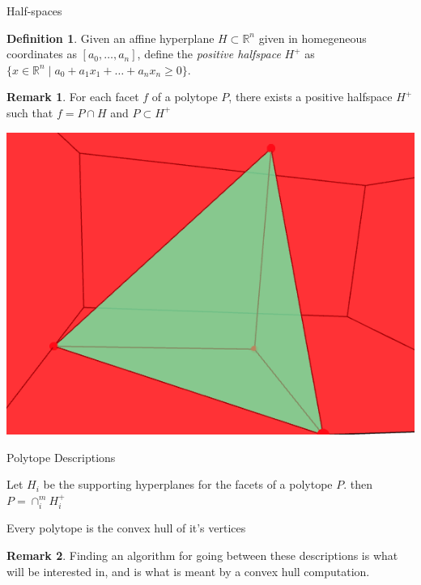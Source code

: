 \documentclass[9pt]{beamer}
\theoremstyle{definition}
\newtheorem*{remark}{Remark}
\newtheorem{defn}{Definition}
\begin{document}
\begin{frame}[fragile]{Half-spaces}
  \begin{defn}
    Given an affine hyperplane $H \subset \mathbb{R}^n$ given in homegeneous
    coordinates as $[a_0, \dots, a_n]$, define the \emph{positive halfspace}
    $H^+$ as $\{x \in \mathbb{R}^n \mid a_0 + a_1x_1 + \dots + a_nx_n \geq 0 \}$.
  \end{defn}

  \begin{remark}
    For each facet $f$ of a polytope $P$, there exists a positive halfspace $H^+$
    such that $f = P \cap H$ and $ P \subset H^+$
  \end{remark}

  \begin{center}
    \includegraphics[width=.30\textwidth, height=0.4\textheight]{images/half-space}
  \end{center}
\end{frame}

\begin{frame}[fragile]{Polytope Descriptions}
  \begin{theorem}
    Let $H_i$ be the supporting hyperplanes for the facets of a polytope $P$.
    then $P = \cap_i^m H_i^+$
  \end{theorem}
  \begin{theorem}
    Every polytope is the convex hull of it's vertices
  \end{theorem}
  \begin{remark}
    Finding an algorithm for going between these descriptions is what will be
    interested in, and is what is meant by a convex hull computation.
  \end{remark}
\end{frame}
\end{document}
